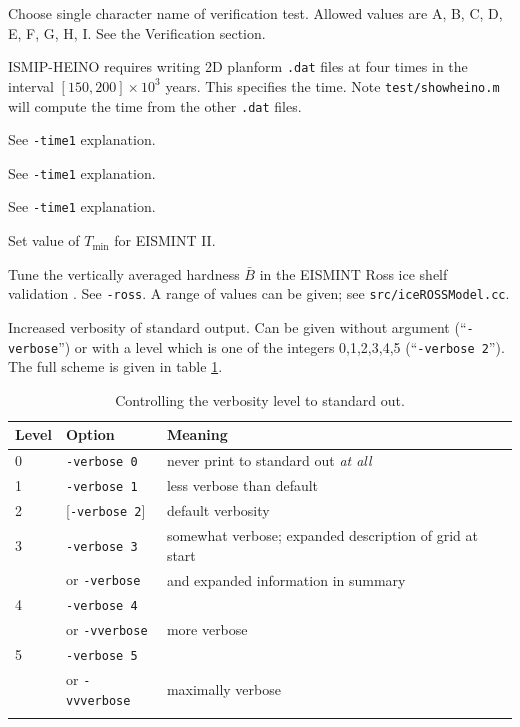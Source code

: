 \documentclass[11pt,final]{amsart}
\renewcommand{\t}[1]{\texttt{#1}}
\begin{document}
  Choose single character name of verification test.  Allowed values are A, B, C, D, E, F, G, H, I.  See the Verification section.

  ISMIP-HEINO requires writing 2D planform \verb|.dat| files at four times in the interval $[150,200]\times 10^{3}$ years.  This specifies the time.  Note \verb|test/showheino.m| will compute the time from the other \verb|.dat| files.

  See \verb|-time1| explanation.

  See \verb|-time1| explanation.

  See \verb|-time1| explanation.

    Set value of $T_{\text{min}}$ for EISMINT II.

    Tune the vertically averaged hardness $\bar B$ in the EISMINT Ross ice shelf validation \cite{MacAyealetal}.  See \verb|-ross|.  A range of values can be given; see \verb|src/iceROSSModel.cc|.

   Increased verbosity of standard output.  Can be given without argument (``\verb|-verbose|'') or with a level which is one of the integers 0,1,2,3,4,5 (``\verb|-verbose 2|'').  The full scheme is given in table \ref{tab:verbosity}.

\begin{table}[h]
\caption{Controlling the verbosity level to standard out.}\label{tab:verbosity}
\begin{tabular}{@{}llll}\hline
\textbf{Level} & \textbf{Option} & \textbf{Meaning} \\ \hline
   0  &  \t{-verbose 0} &   never print to standard out \emph{at all}  \\
   1  &  \t{-verbose 1} &   less verbose than default  \\
   2  &  [\t{-verbose 2}] & default verbosity    \\
   3  &  \t{-verbose 3} &   somewhat verbose; expanded description of grid at start  \\
      &  or \quad \t{-verbose} &  and expanded information in summary    \\
   4  &  \t{-verbose 4} &     \\
      &  or \quad \t{-vverbose} &  more verbose    \\
   5  &  \t{-verbose 5} &     \\
      &  or \quad \t{-vvverbose} &  maximally verbose \\
\hline
\normalsize
\end{tabular}
\end{table}
\end{document}
